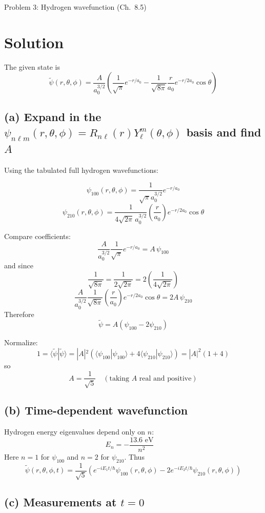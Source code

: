 \documentclass{article}
\begin{document}
\newpage

{\huge Problem 3: Hydrogen wavefunction (Ch.\ 8.5)}

\section*{Solution}

The given state is
\[
\tilde{\psi}(r,\theta,\phi)
=
\frac{A}{a_0^{3/2}}
\left(
\frac{1}{\sqrt{\pi}}e^{-r/a_0}
-
\frac{1}{\sqrt{8\pi}}\frac{r}{a_0}e^{-r/2a_0}\cos\theta
\right)
\]

\subsection*{(a) Expand in the $\psi_{n\ell m}(r,\theta,\phi)=R_{n\ell}(r)Y_\ell^m(\theta,\phi)$ basis and find $A$}

Using the tabulated full hydrogen wavefunctions:

\[
\psi_{100}(r,\theta,\phi)=\frac{1}{\sqrt{\pi}a_0^{3/2}}e^{-r/a_0}
\]
\[
\psi_{210}(r,\theta,\phi)=\frac{1}{4\sqrt{2\pi}\,a_0^{3/2}}
\left(\frac{r}{a_0}\right)e^{-r/2a_0}\cos\theta
\]

Compare coefficients:
\[
\frac{A}{a_0^{3/2}}\frac{1}{\sqrt{\pi}}e^{-r/a_0}=A\,\psi_{100}
\]
and since
\[
\frac{1}{\sqrt{8\pi}}=\frac{1}{2\sqrt{2\pi}}=2\left(\frac{1}{4\sqrt{2\pi}}\right)
\]
\[
\frac{A}{a_0^{3/2}}\frac{1}{\sqrt{8\pi}}\left(\frac{r}{a_0}\right)e^{-r/2a_0}\cos\theta
=2A\,\psi_{210}
\]
Therefore
\[
\boxed{\tilde{\psi}=A\left(\psi_{100}-2\psi_{210}\right)}
\]

Normalize:
\[
1=\langle \tilde{\psi}|\tilde{\psi}\rangle
=|A|^2\left(\langle \psi_{100}|\psi_{100}\rangle+4\langle \psi_{210}|\psi_{210}\rangle\right)
=|A|^2(1+4)
\]
so
\[
\boxed{A=\frac{1}{\sqrt{5}}}
\quad (\text{taking $A$ real and positive})
\]

\subsection*{(b) Time-dependent wavefunction}

Hydrogen energy eigenvalues depend only on $n$:
\[
E_n=-\frac{13.6\text{ eV}}{n^2}\quad
\]
Here $n=1$ for $\psi_{100}$ and $n=2$ for $\psi_{210}$. Thus
\[
\boxed{
\tilde{\psi}(r,\theta,\phi,t)
=
\frac{1}{\sqrt{5}}
\left(
e^{-iE_1 t/\hbar}\psi_{100}(r,\theta,\phi)
-
2e^{-iE_2 t/\hbar}\psi_{210}(r,\theta,\phi)
\right)
}
\]

\subsection*{(c) Measurements at $t=0$}
\end{document}
